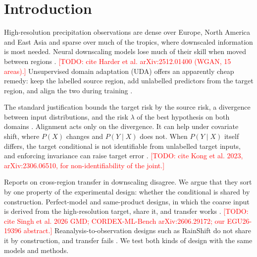 \documentclass{article}
\newcommand{\todo}[1]{\textcolor{red}{[TODO: #1]}}
\begin{document}
\section{Introduction}\label{sec:intro}

High-resolution precipitation observations are dense over Europe, North
America and East Asia and sparse over much of the tropics, where
downscaled information is most needed. Neural downscaling models lose
much of their skill when moved between regions
\citep{harder2025rainshift}. \todo{cite Harder et al. arXiv:2512.01400
(WGAN, 15 areas).} Unsupervised domain adaptation (UDA) offers an
apparently cheap remedy: keep the labelled source region, add unlabelled
predictors from the target region, and align the two during training
\citep{ganin2016domain,long2015learning,sun2016deep}.

The standard justification bounds the target risk by the source risk, a
divergence between input distributions, and the risk $\lambda$ of the best
hypothesis on both domains
\citep{bendavid2010theory,redko2017theoretical}. Alignment acts only on
the divergence. It can help under covariate shift, where $P(X)$ changes
and $P(Y\mid X)$ does not. When $P(Y\mid X)$ itself differs, the target
conditional is not identifiable from unlabelled target inputs, and
enforcing invariance can raise target error
\citep{zhao2019invariant,johansson2019support}. \todo{cite Kong et al.
2023, arXiv:2306.06510, for non-identifiability of the joint.}

Reports on cross-region transfer in downscaling disagree. We argue that
they sort by one property of the experimental design: whether the
conditional is shared by construction. Perfect-model and same-product
designs, in which the coarse input is derived from the high-resolution
target, share it, and transfer works
\citep{qian2026}. \todo{cite Singh et al. 2026 GMD; CORDEX-ML-Bench
arXiv:2606.29172; our EGU26-19396 abstract.} Reanalysis-to-observation
designs such as RainShift do not share it by construction, and transfer
fails \citep{harder2025rainshift}. We test both kinds of design with the
same models and methods.
\end{document}
